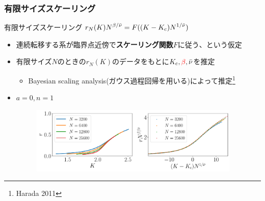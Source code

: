 \begin{frame}\frametitle{有限サイズスケーリング}
  \begin{block}{有限サイズスケーリング}
    \centering
      $\displaystyle r_{N}(K)N^{\beta/\bar{\nu}}=F((K-K_{\mathrm{c}})N^{1/\bar{\nu}})$
  \end{block}
  \begin{itemize}
    \item 連続転移する系が臨界点近傍で\textbf{スケーリング関数}$F$に従う、という仮定
    \item 有限サイズ$N$のときの$r_{N}(K)$のデータをもとに$K_{\mathrm{c}},\textcolor{red}{\beta},\bar{\nu}$を推定
    \begin{itemize}
      \item Bayesian scaling analysis(ガウス過程回帰を用いる)によって推定\footnote{Harada 2011}
    \end{itemize}
    \item $a=0, n=1$
    \begin{figure}
      \centering
      \includegraphics[width=10cm]{figs/a-0_n-1_fss.pdf}
    \end{figure}
  \end{itemize}
\end{frame}


